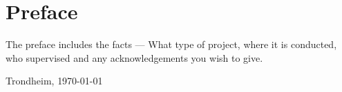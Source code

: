 \chapter*{Preface}
\vspace{1cm}
The preface includes the facts --- What type of project, where it is conducted, who supervised and any acknowledgements you wish to give. 
\vfill
\begin{flushright}
    \thesisAuthor\par
    Trondheim, {\usdate\today}
\end{flushright}